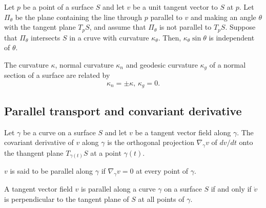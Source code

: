 \begin{proposition}
  Let $p$ be a point of a surface $S$ and let $v$ be a unit tangent
  vector to $S$ at $p$. Let $\Pi_{\theta}$ be the plane containing
  the line through $p$ parallel to $v$ and making an angle $\theta$ with
  the tangent plane $T_p S$, and assume that $\Pi_{\theta}$ is not
  parallel to $T_p S$. Suppose that $\Pi_{\theta}$ intersects $S$
  in a cruve with curvature $\kappa_{\theta}$. Then,
  $\kappa_{\theta} \sin \theta$ is independent of $\theta$.
\end{proposition}

\begin{corollary}
  The curvature $\kappa$, normal curvature $\kappa_n$ and
  geodesic curvature $\kappa_g$ of a normal section of a surface are
  related by
  \[
    \kappa_n = \pm \kappa, \, \kappa_g = 0.  
  \]
\end{corollary}

\subsection{Parallel transport and convariant derivative}

\begin{defn}
  Let $\gamma$ be a curve on a surface $S$ and let $v$ be a tangent
  vector field along $\gamma$. The covariant derivative of $v$ along
  $\gamma$ is the orthogonal projection $\nabla_{\gamma}v$ of
  $dv/dt$ onto the thangent plane $T_{\gamma(t)} S$ at a point $\gamma(t)$.
\end{defn}

\begin{defn}
  $v$ is said to be parallel along $\gamma$ if
  $\nabla_{\gamma}v = 0$ at every point of $\gamma$.
\end{defn}

\begin{proposition}
  A tangent vector field $v$ is parallel along a curve $\gamma$ on a
  surface $S$ if and only if $\dot{v}$ is perpendicular to the
  tangent plane of $S$ at all points of $\gamma$.
\end{proposition}

